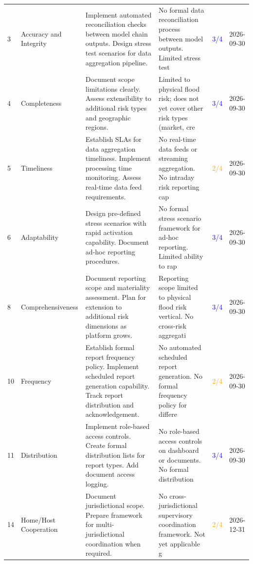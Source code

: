 \documentclass[11pt]{article}
\begin{document}
\begin{longtable}{p{0.5cm}p{3cm}p{5.5cm}p{2.5cm}p{1.5cm}p{2cm}}
    3 & Accuracy and Integrity & Implement automated reconciliation checks between model chain outputs. Design stress test scenarios for data aggregation pipeline. & No formal data reconciliation process between model outputs. Limited stress test & \textcolor{blue}{3/4} & 2026-09-30 \\
    4 & Completeness & Document scope limitations clearly. Assess extensibility to additional risk types and geographic regions. & Limited to physical flood risk; does not yet cover other risk types (market, cre & \textcolor{blue}{3/4} & 2026-09-30 \\
    5 & Timeliness & Establish SLAs for data aggregation timeliness. Implement processing time monitoring. Assess real-time data feed requirements. & No real-time data feeds or streaming aggregation. No intraday risk reporting cap & \textcolor{orange}{2/4} & 2026-09-30 \\
    6 & Adaptability & Design pre-defined stress scenarios with rapid activation capability. Document ad-hoc reporting procedures. & No formal stress scenario framework for ad-hoc reporting. Limited ability to rap & \textcolor{blue}{3/4} & 2026-09-30 \\
    8 & Comprehensiveness & Document reporting scope and materiality assessment. Plan for extension to additional risk dimensions as platform grows. & Reporting scope limited to physical flood risk vertical. No cross-risk aggregati & \textcolor{blue}{3/4} & 2026-09-30 \\
    10 & Frequency & Establish formal report frequency policy. Implement scheduled report generation capability. Track report distribution and acknowledgement. & No automated scheduled report generation. No formal frequency policy for differe & \textcolor{orange}{2/4} & 2026-09-30 \\
    11 & Distribution & Implement role-based access controls. Create formal distribution lists for report types. Add document access logging. & No role-based access controls on dashboard or documents. No formal distribution  & \textcolor{blue}{3/4} & 2026-09-30 \\
    14 & Home/Host Cooperation & Document jurisdictional scope. Prepare framework for multi-jurisdictional coordination when required. & No cross-jurisdictional supervisory coordination framework. Not yet applicable g & \textcolor{orange}{2/4} & 2026-12-31 \\
    \bottomrule
\end{longtable}

\clearpage
\end{document}
